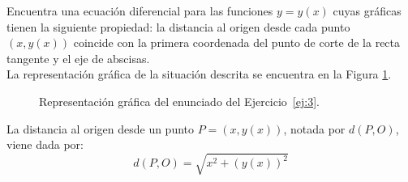 \documentclass[12pt]{article}
\begin{document}
    \begin{ejercicio} \label{ej:3}
        Encuentra una ecuación diferencial para las funciones $y=y(x)$ cuyas gráficas tienen la siguiente propiedad:
        la distancia al origen desde cada punto $(x,y(x))$ coincide con la primera coordenada del punto de corte de la recta tangente y el eje de abscisas.\\

        La representación gráfica de la situación descrita se encuentra en la Figura \ref{fig:ej:3}.
        \begin{figure}
            \centering
            \caption{Representación gráfica del enunciado del Ejercicio~\ref{ej:3}.}
            \label{fig:ej:3}
        \end{figure}

        La distancia al origen desde un punto $P=(x,y(x))$, notada por $d(P,O)$, viene dada por:
        \begin{equation*}
            d(P,O) = \sqrt{x^2 + (y(x))^2}
        \end{equation*}


\end{ejercicio}
\end{document}
